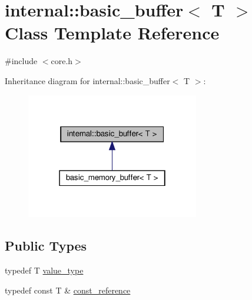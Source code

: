 \hypertarget{classinternal_1_1basic__buffer}{}\section{internal\+:\+:basic\+\_\+buffer$<$ T $>$ Class Template Reference}
\label{classinternal_1_1basic__buffer}


{\ttfamily \#include $<$core.\+h$>$}



Inheritance diagram for internal\+:\+:basic\+\_\+buffer$<$ T $>$\+:
\nopagebreak
\begin{figure}[H]
\begin{center}
\leavevmode
\includegraphics[width=214pt]{classinternal_1_1basic__buffer__inherit__graph}
\end{center}
\end{figure}
\subsection*{Public Types}
\begin{DoxyCompactItemize}
\item 
typedef T \hyperlink{classinternal_1_1basic__buffer_aae8a0f184091f512efbde04b2ba1ddd7}{value\+\_\+type}
\item 
typedef const T \& \hyperlink{classinternal_1_1basic__buffer_adf277d724f8082f015258414ab206743}{const\+\_\+reference}
\end{DoxyCompactItemize}
